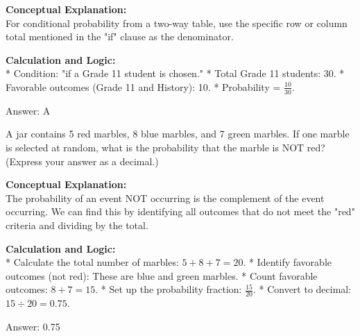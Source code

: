 \documentclass[11pt,paper=a4,answers]{exam}
\begin{document}
\begin{questions}
\begin{solution}
\textbf{Conceptual Explanation:} \\
For conditional probability from a two-way table, use the specific row or column total mentioned in the "if" clause as the denominator.

\vspace{30pt}

\textbf{Calculation and Logic:} \\
* Condition: "if a Grade 11 student is chosen." 
* Total Grade 11 students: 30.
* Favorable outcomes (Grade 11 and History): 10.
* Probability = $\frac{10}{30}$.

\vspace{30pt}

Answer: \colorbox{yellow!100}{A}
\end{solution}

\question
A jar contains 5 red marbles, 8 blue marbles, and 7 green marbles. If one marble is selected at random, what is the probability that the marble is NOT red? (Express your answer as a decimal.)

\begin{solution}
\textbf{Conceptual Explanation:} \\
The probability of an event NOT occurring is the complement of the event occurring. We can find this by identifying all outcomes that do not meet the "red" criteria and dividing by the total.

\vspace{30pt}

\textbf{Calculation and Logic:} \\
* Calculate the total number of marbles: $5 + 8 + 7 = 20$.
* Identify favorable outcomes (not red): These are blue and green marbles.
* Count favorable outcomes: $8 + 7 = 15$.
* Set up the probability fraction: $\frac{15}{20}$.
* Convert to decimal: $15 \div 20 = 0.75$.

\vspace{30pt}

Answer: \colorbox{yellow!100}{0.75}
\end{solution}

\vspace{60pt}


\end{questions}
\end{document}
